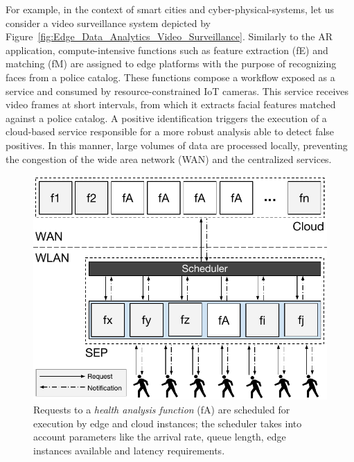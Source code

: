 \documentclass[letterpaper, 10 pt, conference]{ieeeconf}  %
\begin{document}

For example, in the context of smart cities and cyber-physical-systems, let us consider a video surveillance system depicted by Figure~\ref{fig:Edge_Data_Analytics_Video_Surveillance}. Similarly to the AR application, compute-intensive functions such as feature extraction (fE) and matching (fM) are assigned to edge platforms with the purpose of recognizing faces from a police catalog. These functions compose a workflow exposed as a service and consumed by resource-constrained IoT cameras. This service receives video frames at short intervals, from which it extracts facial features matched against a police catalog. A positive identification triggers the execution of a cloud-based service responsible for a more robust analysis able to detect false positives. In this manner, large volumes of data are processed locally, preventing the congestion of the wide area network (WAN) and the centralized services.

\begin{figure}[tbp]
	\centering
	\includegraphics[width=\linewidth]{Figs/Edge_Data_Analytics_Personal_Assistant.pdf}
	\caption{Requests to a \textit{health analysis function} (fA) are scheduled for execution by edge and cloud instances; the scheduler takes into account parameters like the arrival rate, queue length, edge instances available and latency requirements.} 
	\label{fig:Edge_Data_Analytics_Personal_Assistant}
\end{figure}
\end{document}
